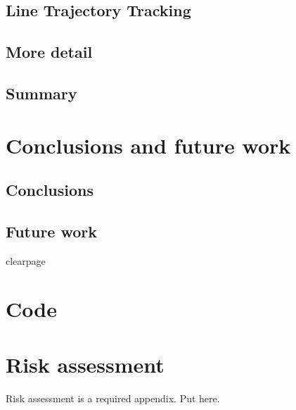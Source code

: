     \subsection{Line Trajectory Tracking}
    \subsection{More detail}
    \subsection{Summary}
  \section{Conclusions and future work} %
    \subsection{Conclusions}
      \subsection{Future work}
  clearpage %
  \printbibliography[title={References},heading=bibintoc] %
  \begin{uomappendix} 
      \section{Code}
      \section{Risk assessment}
      Risk assessment is a required appendix. Put here.
  \end{uomappendix}
  
  